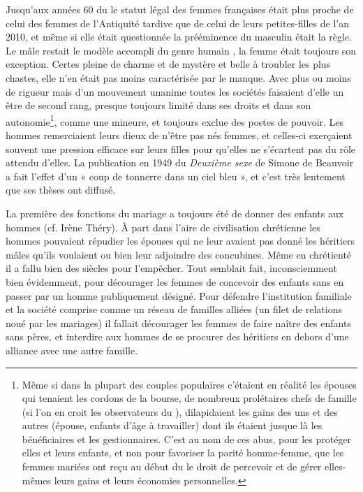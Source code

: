 Jusqu'aux années 60 du  le statut légal des femmes françaises était plus proche de celui des femmes de l'Antiquité tardive que de celui de leurs petites-filles de l'an 2010, et même si elle était questionnée la prééminence du masculin était la règle. Le mâle  restait le modèle accompli du genre humain , la femme était toujours son exception. Certes pleine de charme et de mystère et belle à troubler les plus chastes, elle n'en était pas moins caractérisée par le manque. Avec plus ou moins de rigueur mais d'un mouvement unanime toutes les sociétés faisaient d'elle un être de second rang, presque toujours limité dans ses droits et dans son autonomie\footnote{Même si dans la plupart des couples populaires c'étaient en réalité les épouses qui tenaient les cordons de la bourse,  de nombreux prolétaires chefs de famille (si l'on en croit les observateurs du ), dilapidaient les gains des uns et des autres (épouse, enfants d'âge à travailler) dont ils étaient jusque là les bénéficiaires et les gestionnaires. C'est au nom de ces abus, pour les protéger elles et leurs enfants, et non pour favoriser la parité homme-femme, que les femmes mariées ont reçu au début du  le droit de percevoir et de gérer elles-mêmes leurs gains et leurs économies personnelles.}, comme une mineure, et toujours exclue des postes de pouvoir. Les hommes remerciaient leurs dieux de n'être pas nés femmes, et celles-ci exerçaient souvent une pression efficace sur leurs filles pour qu'elles ne s'écartent pas du rôle attendu d'elles. La publication en 1949 du \emph{Deuxième sexe} de Simone de Beauvoir a fait l'effet d'un « coup de tonnerre dans un ciel bleu », et c'est très lentement que ses thèses ont diffusé.
 
 
 
La première des fonctions du mariage a toujours été de donner des enfants aux hommes (cf. Irène Théry). À part dans l'aire de civilisation chrétienne les hommes pouvaient répudier les épouses qui ne leur avaient pas donné les héritiers mâles qu'ils voulaient ou bien leur adjoindre des concubines. Même en chrétienté il a fallu bien des siècles pour l'empêcher. Tout semblait fait, inconsciemment bien évidemment, pour décourager les femmes de concevoir des enfants sans en passer par un homme publiquement désigné. Pour défendre l'institution familiale et la société comprise comme un réseau de familles alliées (un filet de relations noué par les mariages) il fallait décourager les femmes de faire naître des enfants sans pères, et interdire aux hommes de se procurer des héritiers en dehors d'une alliance avec une autre famille. 

